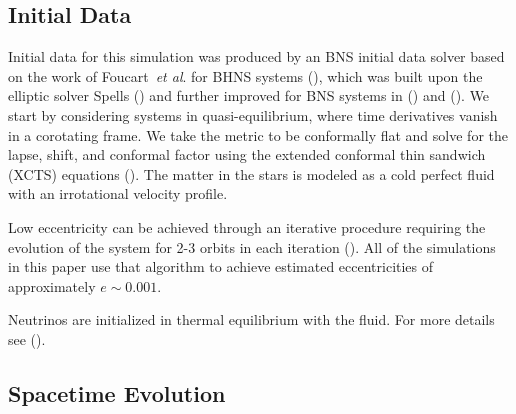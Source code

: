 \subsection{Initial Data}

Initial data for this simulation was produced by an BNS initial data solver based on the work of Foucart~{\it et
al}. for BHNS systems (\cite{foucart2008initial}), which was built upon the elliptic solver Spells (\cite{pfeiffer2003}) and further improved for BNS systems in (\cite{tacik2015binary}) and (\cite{haas:2016}). We start by considering systems in quasi-equilibrium, where time
derivatives vanish in a corotating frame. We take the metric to be conformally flat and solve for the lapse,
shift, and conformal factor using the extended conformal thin sandwich (XCTS) equations (\cite{pfeiffer2003b}). The matter in the stars is modeled as a cold perfect fluid with an irrotational velocity profile.

Low eccentricity can be achieved through an iterative procedure requiring the evolution of the system for 2-3 orbits in each iteration (\cite{pfeiffer2007reducing}). All of the simulations in this paper use that algorithm to achieve estimated eccentricities of approximately $e\sim 0.001$.

Neutrinos are initialized in thermal equilibrium with the fluid. For more details see (\cite{foucart2016impact}).


\subsection{Spacetime Evolution}



